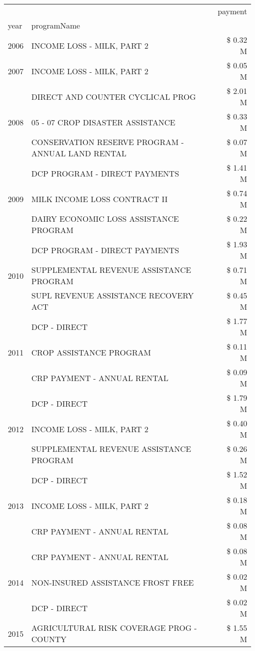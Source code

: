 \begin{tabular}{llr}
\toprule
 &  & payment \\
year & programName &  \\
\midrule
2006 & INCOME LOSS - MILK, PART 2 & \$ 0.32 M \\
\cline{1-3}
2007 & INCOME LOSS - MILK, PART 2 & \$ 0.05 M \\
\cline{1-3}
\multirow[t]{3}{*}{2008} & DIRECT AND COUNTER CYCLICAL PROG & \$ 2.01 M \\
 & 05 - 07 CROP DISASTER ASSISTANCE & \$ 0.33 M \\
 & CONSERVATION RESERVE PROGRAM - ANNUAL LAND RENTAL & \$ 0.07 M \\
\cline{1-3}
\multirow[t]{3}{*}{2009} & DCP PROGRAM - DIRECT PAYMENTS & \$ 1.41 M \\
 & MILK INCOME LOSS CONTRACT II & \$ 0.74 M \\
 & DAIRY ECONOMIC LOSS ASSISTANCE PROGRAM & \$ 0.22 M \\
\cline{1-3}
\multirow[t]{3}{*}{2010} & DCP PROGRAM - DIRECT PAYMENTS & \$ 1.93 M \\
 & SUPPLEMENTAL REVENUE ASSISTANCE PROGRAM & \$ 0.71 M \\
 & SUPL REVENUE ASSISTANCE RECOVERY ACT & \$ 0.45 M \\
\cline{1-3}
\multirow[t]{3}{*}{2011} & DCP - DIRECT & \$ 1.77 M \\
 & CROP ASSISTANCE PROGRAM & \$ 0.11 M \\
 & CRP PAYMENT - ANNUAL RENTAL & \$ 0.09 M \\
\cline{1-3}
\multirow[t]{3}{*}{2012} & DCP - DIRECT & \$ 1.79 M \\
 & INCOME LOSS - MILK, PART 2 & \$ 0.40 M \\
 & SUPPLEMENTAL REVENUE ASSISTANCE PROGRAM & \$ 0.26 M \\
\cline{1-3}
\multirow[t]{3}{*}{2013} & DCP - DIRECT & \$ 1.52 M \\
 & INCOME LOSS - MILK, PART 2 & \$ 0.18 M \\
 & CRP PAYMENT - ANNUAL RENTAL & \$ 0.08 M \\
\cline{1-3}
\multirow[t]{3}{*}{2014} & CRP PAYMENT - ANNUAL RENTAL & \$ 0.08 M \\
 & NON-INSURED ASSISTANCE FROST FREE & \$ 0.02 M \\
 & DCP - DIRECT & \$ 0.02 M \\
\cline{1-3}
\multirow[t]{3}{*}{2015} & AGRICULTURAL RISK COVERAGE PROG - COUNTY & \$ 1.55 M \\

\end{tabular}
